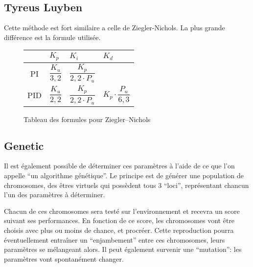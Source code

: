 \documentclass[a4paper,10pt]{report}
\begin{document}
\subsection{Tyreus Luyben}
Cette méthode est fort similaire a celle de Ziegler-Nichols. La plus grande différence est la formule utilisée.\cite{shahrokhi2013comparison}

\def\tabularxcolumn#1{m{#1}}
\begin{figure}[ht]
    \begin{center}
        \begin{tabularx}{\textwidth}{| c | X | X | X |}
            \hline
            & $K_p$ & $K_i$ & $K_d$\\ \hline
            PI & \begin{equation*}\frac{K_u}{3,2}\end{equation*} & \begin{equation*}\frac{K_p}{2,2 \cdot P_u}\end{equation*} &\\ \hline
            PID & \begin{equation*}\frac{K_u}{2,2}\end{equation*} & \begin{equation*}\frac{K_p}{2,2 \cdot P_u}\end{equation*} & \begin{equation*}K_p \cdot \frac{P_u}{6,3}\end{equation*} \\
            \hline
        \end{tabularx}
    \end{center}
    \caption{Tableau des formules pour Ziegler–Nichols}
    \label{tab:ZieglerNicholsTuningFormulas}
\end{figure}

\subsection{Genetic}
Il est également possible de déterminer ces paramètres à l'aide de ce que l'on appelle ``un algorithme génétique''.
Le principe est de générer une population de chromosomes, des êtres virtuels qui possèdent tous 3 ``loci'', représentant chancun l'un des paramètres à déterminer.

Chacun de ces chromosomes sera testé sur l'environnement et recevra un score suivant ses performances.
En fonction de ce score, les chromosomes vont être choisis avec plus ou moins de chance, et procréer.
Cette reproduction pourra éventuellement entraîner un ``enjambement'' entre ces chromosomes, leurs paramètres se mélangeant alors.
Il peut également survenir une ``mutation'': les paramètres vont spontanément changer.
\end{document}
